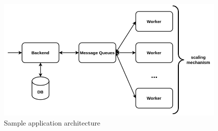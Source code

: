 \begin{figure}[h]
	\centering
	\includegraphics[width=130mm, keepaspectratio]{figures/sample_app_arch.png}
	\caption{Sample application architecture}
	\label{fig:sample_app_arch}
\end{figure}
%
%


%	


